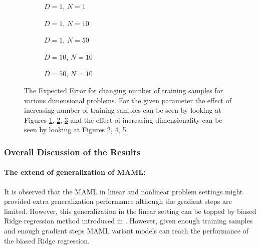 \begin{figure}[!h]
  \centering
    \begin{subfigure}{0.33\textwidth}
      \centering
      \caption{$D=1$, $N=1$}
      \label{fig:nonlinear-c2-N-1-D-1}
    \end{subfigure}
    \begin{subfigure}{0.33\textwidth}
      \centering
      \caption{$D=1$, $N=10$}
      \label{fig:nonlinear-c2-N-10-D-1}
    \end{subfigure}
    \begin{subfigure}{0.33\textwidth}
      \centering
      \caption{$D=1$, $N=50$}
      \label{fig:nonlinear-c2-N-50-D-1}
    \end{subfigure}

    \begin{subfigure}{0.33\textwidth}
      \centering
      \caption{$D=10$, $N=10$}
      \label{fig:nonlinear-c2-N-10-D-10}
    \end{subfigure}
    \begin{subfigure}{0.33\textwidth}
      \centering
      \caption{$D=50$, $N=10$}
      \label{fig:nonlinear-c2-N-10-D-50}
    \end{subfigure}  

  \caption{The Expected Error for changing number of training samples for various dimensional problems. For the given parameter the effect of increasing number of training samples can be seen by looking at Figures \ref{fig:nonlinear-c2-N-1-D-1}, \ref{fig:nonlinear-c2-N-10-D-1}, \ref{fig:nonlinear-c2-N-50-D-1} and the effect of increasing dimensionality can be seen by looking at Figures \ref{fig:nonlinear-c2-N-10-D-1}, \ref{fig:nonlinear-c2-N-10-D-10}, \ref{fig:nonlinear-c2-N-10-D-50}.}\label{fig:nonlinear-c2}
\end{figure}

\subsubsection{Overall Discussion of the Results}

\paragraph{The extend of generalization of MAML:} It is observed that the MAML in linear and nonlinear problem settings might provided extra generalization performance although the gradient steps are limited. However, this generalization in the linear setting can be topped by biased Ridge regression method introduced in \cite{Denevi2018a}. However, given enough training samples and enough gradient steps MAML variant models can reach the performance of the biased Ridge regression. 

